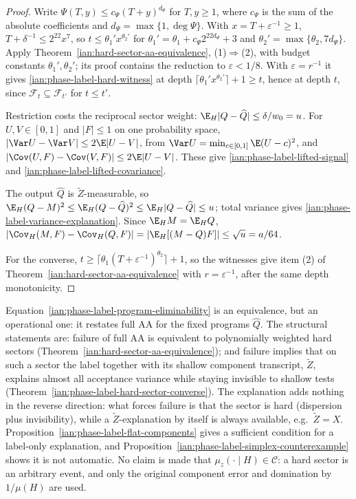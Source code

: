 \begin{proof}
Write \(\Psi(T,y)\le c_\Psi(T+y)^{d_\Psi}\) for \(T,y\ge1\), where
\(c_\Psi\) is the sum of the absolute coefficients and
\(d_\Psi=\max\{1,\deg\Psi\}\). With \(x=T+\varepsilon^{-1}\ge1\),
\(T+\delta^{-1}\le2^{22}x^7\), so
\(t\le\theta_1'x^{\theta_2'}\) for
\(\theta_1'=\theta_1+c_\Psi2^{22d_\Psi}+3\) and
\(\theta_2'=\max\{\theta_2,7d_\Psi\}\). Apply
Theorem~\ref{ian:hard-sector-aa-equivalence}, (1)\(\Rightarrow\)(2), with
budget constants \(\theta_1',\theta_2'\); its proof contains the
reduction to \(\varepsilon<1/8\). With \(\varepsilon=r^{-1}\) it gives
\eqref{ian:phase-label-hard-witness} at depth
\(\lceil\theta_1'x^{\theta_2'}\rceil+1\ge t\), hence at depth \(t\),
since \(\mathcal F_t\subseteq\mathcal F_{t'}\) for \(t\le t'\).

Restriction costs the reciprocal sector weight:
\(\E_H|Q-\widehat Q|\le\delta/w_0=u\). For \(U,V\in[0,1]\) and
\(|F|\le1\) on one probability space,
\(|\Var U-\Var V|\le2\E|U-V|\), from
\(\Var U=\min_{c\in[0,1]}\E(U-c)^2\), and
\(|\Cov(U,F)-\Cov(V,F)|\le2\E|U-V|\). These give
\eqref{ian:phase-label-lifted-signal} and
\eqref{ian:phase-label-lifted-covariance}.

The output \(\widehat Q\) is \(\widetilde Z\)-measurable, so
\(\E_H(Q-M)^2\le\E_H(Q-\widehat Q)^2\le\E_H|Q-\widehat Q|\le u\); total
variance gives \eqref{ian:phase-label-variance-explanation}. Since
\(\E_HM=\E_HQ\),
\(|\Cov_H(M,F)-\Cov_H(Q,F)|=|\E_H[(M-Q)F]|\le\sqrt u=a/64\).

For the converse, \(t\ge\lceil\theta_1(T+\varepsilon^{-1})^{\theta_2}\rceil+1\),
so the witnesses give item (2) of
Theorem~\ref{ian:hard-sector-aa-equivalence} with \(r=\varepsilon^{-1}\),
after the same depth monotonicity.
\end{proof}

\begin{remark}
\label{ian:phase-label-headline}
Equation~\eqref{ian:phase-label-program-eliminability} is an equivalence,
but an operational one: it restates full AA for the fixed programs
\(\widehat Q\). The structural statements are: failure of full AA is
equivalent to polynomially weighted hard sectors
(Theorem~\ref{ian:hard-sector-aa-equivalence}); and failure implies that
on such a sector the label together with its shallow component
transcript, \(\widetilde Z\), explains almost all acceptance variance
while staying invisible to shallow tests
(Theorem~\ref{ian:phase-label-hard-sector-converse}). The explanation
adds nothing in the reverse direction: what forces failure is that the
sector is hard (dispersion plus invisibility), while a
\(\widetilde Z\)-explanation by itself is always available, e.g.\
\(\widetilde Z=X\).
Proposition~\ref{ian:phase-label-flat-components} gives a sufficient
condition for a label-only explanation, and
Proposition~\ref{ian:phase-label-simplex-counterexample} shows it is not
automatic. No claim is made that \(\mu_z(\cdot\mid H)\in\mathcal C\): a
hard sector is an arbitrary event, and only the original component
error and domination by \(1/\mu(H)\) are used.
\end{remark}

